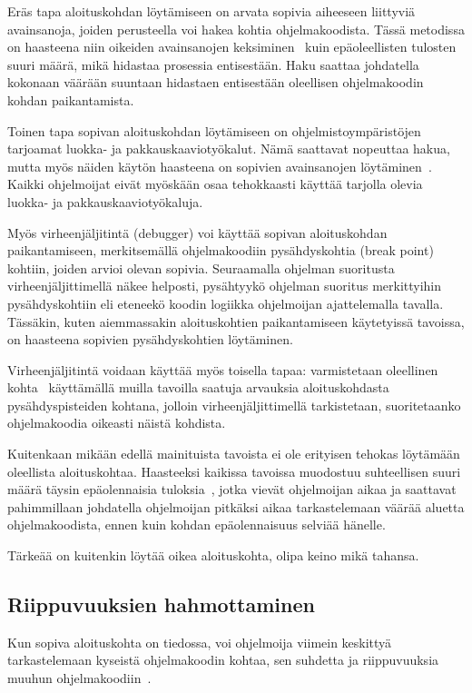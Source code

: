 \documentclass[finnish]{tktltiki2}
\theoremstyle{definition}
\theoremstyle{remark}
\begin{document}
Eräs tapa aloituskohdan löytämiseen on arvata sopivia aiheeseen liittyviä avainsanoja, joiden perusteella voi hakea kohtia ohjelmakoodista. Tässä metodissa on haasteena niin oikeiden avainsanojen keksiminen~\cite{what-to-search-for} kuin epäoleellisten tulosten suuri määrä, mikä hidastaa prosessia entisestään. Haku saattaa johdatella kokonaan väärään suuntaan hidastaen entisestään oleellisen ohjelmakoodin kohdan paikantamista.

Toinen tapa sopivan aloituskohdan löytämiseen on ohjelmistoympäristöjen tarjoamat luokka- ja pakkauskaaviotyökalut. Nämä saattavat nopeuttaa hakua, mutta myös näiden käytön haasteena on sopivien avainsanojen löytäminen~\cite{what-to-search-for}. Kaikki ohjelmoijat eivät myöskään osaa tehokkaasti käyttää tarjolla olevia luokka- ja pakkauskaaviotyökaluja.

Myös virheenjäljitintä (debugger) voi käyttää sopivan aloituskohdan paikantamiseen, merkitsemällä ohjelmakoodiin pysähdyskohtia (break point) kohtiin, joiden arvioi olevan sopivia.
Seuraamalla ohjelman suoritusta virheenjäljittimellä näkee helposti, pysähtyykö ohjelman suoritus merkittyihin pysähdyskohtiin eli eteneekö koodin logiikka ohjelmoijan ajattelemalla tavalla.
Tässäkin, kuten aiemmassakin aloituskohtien paikantamiseen käytetyissä tavoissa, on haasteena sopivien pysähdyskohtien löytäminen.

Virheenjäljitintä voidaan käyttää myös toisella tapaa: varmistetaan oleellinen kohta~\cite{eliciting-design-requirements-for-maintenance-oriented-ides} käyttämällä muilla tavoilla saatuja arvauksia aloituskohdasta pysähdyspisteiden kohtana, jolloin virheenjäljittimellä tarkistetaan, suoritetaanko ohjelmakoodia oikeasti näistä kohdista.

Kuitenkaan mikään edellä mainituista tavoista ei ole erityisen tehokas löytämään oleellista aloituskohtaa. Haasteeksi kaikissa tavoissa muodostuu suhteellisen suuri määrä täysin epäolennaisia tuloksia~\cite{eliciting-design-requirements-for-maintenance-oriented-ides}, jotka vievät ohjelmoijan aikaa ja saattavat pahimmillaan johdatella ohjelmoijan pitkäksi aikaa tarkastelemaan väärää aluetta ohjelmakoodista, ennen kuin kohdan epäolennaisuus selviää hänelle.

Tärkeää on kuitenkin löytää oikea aloituskohta, olipa keino mikä tahansa.

\subsection{Riippuvuuksien hahmottaminen}
Kun sopiva aloituskohta on tiedossa, voi ohjelmoija viimein keskittyä tarkastelemaan kyseistä ohjelmakoodin kohtaa, sen suhdetta ja riippuvuuksia muuhun ohjelmakoodiin~\cite{questions-during-software-evolution-tasks}.
\end{document}
